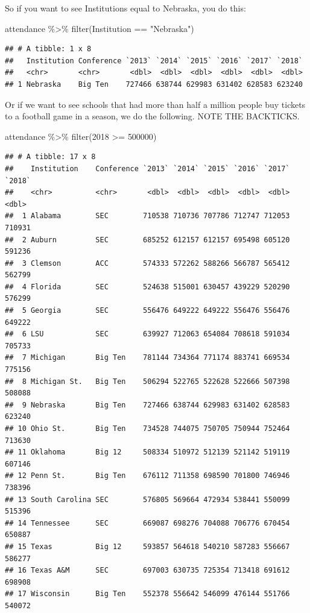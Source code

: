 \documentclass[
]{book}
\newenvironment{Shaded}{\begin{snugshade}}{\end{snugshade}}
\newcommand{\AttributeTok}[1]{\textcolor[rgb]{0.77,0.63,0.00}{#1}}
\newcommand{\DecValTok}[1]{\textcolor[rgb]{0.00,0.00,0.81}{#1}}
\newcommand{\FunctionTok}[1]{\textcolor[rgb]{0.00,0.00,0.00}{#1}}
\newcommand{\NormalTok}[1]{#1}
\newcommand{\SpecialCharTok}[1]{\textcolor[rgb]{0.00,0.00,0.00}{#1}}
\newcommand{\StringTok}[1]{\textcolor[rgb]{0.31,0.60,0.02}{#1}}
\begin{document}
So if you want to see Institutions equal to Nebraska, you do this:

\begin{Shaded}
\begin{Highlighting}[]
\NormalTok{attendance }\SpecialCharTok{\%\textgreater{}\%} \FunctionTok{filter}\NormalTok{(Institution }\SpecialCharTok{==} \StringTok{"Nebraska"}\NormalTok{)}
\end{Highlighting}
\end{Shaded}

\begin{verbatim}
## # A tibble: 1 x 8
##   Institution Conference `2013` `2014` `2015` `2016` `2017` `2018`
##   <chr>       <chr>       <dbl>  <dbl>  <dbl>  <dbl>  <dbl>  <dbl>
## 1 Nebraska    Big Ten    727466 638744 629983 631402 628583 623240
\end{verbatim}

Or if we want to see schools that had more than half a million people buy tickets to a football game in a season, we do the following. NOTE THE BACKTICKS.

\begin{Shaded}
\begin{Highlighting}[]
\NormalTok{attendance }\SpecialCharTok{\%\textgreater{}\%} \FunctionTok{filter}\NormalTok{(}\StringTok{\textasciigrave{}}\AttributeTok{2018}\StringTok{\textasciigrave{}} \SpecialCharTok{\textgreater{}=} \DecValTok{500000}\NormalTok{)}
\end{Highlighting}
\end{Shaded}

\begin{verbatim}
## # A tibble: 17 x 8
##    Institution    Conference `2013` `2014` `2015` `2016` `2017` `2018`
##    <chr>          <chr>       <dbl>  <dbl>  <dbl>  <dbl>  <dbl>  <dbl>
##  1 Alabama        SEC        710538 710736 707786 712747 712053 710931
##  2 Auburn         SEC        685252 612157 612157 695498 605120 591236
##  3 Clemson        ACC        574333 572262 588266 566787 565412 562799
##  4 Florida        SEC        524638 515001 630457 439229 520290 576299
##  5 Georgia        SEC        556476 649222 649222 556476 556476 649222
##  6 LSU            SEC        639927 712063 654084 708618 591034 705733
##  7 Michigan       Big Ten    781144 734364 771174 883741 669534 775156
##  8 Michigan St.   Big Ten    506294 522765 522628 522666 507398 508088
##  9 Nebraska       Big Ten    727466 638744 629983 631402 628583 623240
## 10 Ohio St.       Big Ten    734528 744075 750705 750944 752464 713630
## 11 Oklahoma       Big 12     508334 510972 512139 521142 519119 607146
## 12 Penn St.       Big Ten    676112 711358 698590 701800 746946 738396
## 13 South Carolina SEC        576805 569664 472934 538441 550099 515396
## 14 Tennessee      SEC        669087 698276 704088 706776 670454 650887
## 15 Texas          Big 12     593857 564618 540210 587283 556667 586277
## 16 Texas A&M      SEC        697003 630735 725354 713418 691612 698908
## 17 Wisconsin      Big Ten    552378 556642 546099 476144 551766 540072
\end{verbatim}
\end{document}

